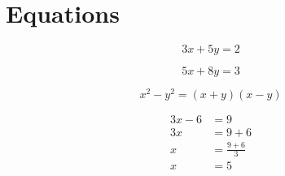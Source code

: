 \documentclass{article}
\begin{document}
    \section{Equations}
    \begin{equation}
        3x + 5y = 2
    \end{equation}
    
    \begin{equation}
        5x + 8y = 3
    \end{equation}

    \begin{equation}
        x^{2} - y^{2} = (x+y)(x-y)
    \end{equation}

    \begin{align}
        3x - 6 &= 9 \\
        3x &= 9 + 6 \nonumber \\
        x &= \frac{9+6}{3} \nonumber \\
        x &= 5 \nonumber
    \end{align}
\end{document}

